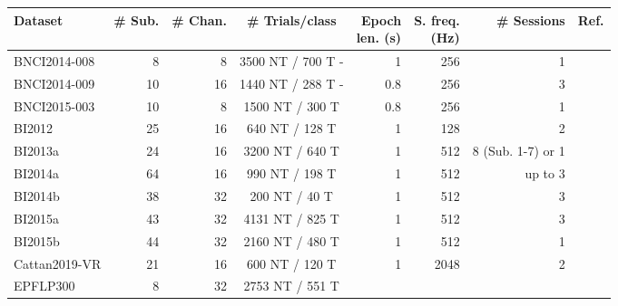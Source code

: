 \begin{tabularx}{\linewidth}{@{}Xrrcrrrr@{}}
		\toprule
		Dataset        & \# Sub.               & \# Chan. & \# Trials/class
                   & \makecell{Epoch \\ len. (s)} & \makecell{S. freq.\\  (Hz)}
                   & \# Sessions & Ref. \\ \midrule
		BNCI2014-008  & 8                          & 8           & 3500 NT / 700 T
            -     &1&256& 1                          &                                         \\
		BNCI2014-009  & 10                         & 16          & 1440 NT / 288 T
            -     &0.8&256& 3                          &                                         \\
		BNCI2015-003  & 10                         & 8           & 1500 NT / 300 T
                   &0.8&256& 1                          &                                          \\
		BI2012         & 25                         & 16          & 640 NT / 128 T
                   &1& 128 & 2                          &                                          \\
		BI2013a        & 24                         & 16          & 3200 NT / 640 T
                   &1&512& 8 (Sub. 1-7) or 1          &                                          \\
		BI2014a        & 64                         & 16          & 990 NT / 198 T
                   &1&512& up to 3                    &                                          \\
		BI2014b        & 38                         & 32          & 200 NT / 40 T
                   &1&512& 3                          &                                          \\
		BI2015a        & 43                         & 32          & 4131 NT / 825 T
                   &1&512& 3                          &                                          \\
		BI2015b        & 44                         & 32          & 2160 NT / 480 T
                   &1&512& 1                          &                                          \\
		Cattan2019-VR & 21                         & 16          & 600 NT / 120 T
                   &1&2048& 2                          &                                          \\
		EPFLP300       & 8                          & 32          & 2753 NT / 551 T

\end{tabularx}
